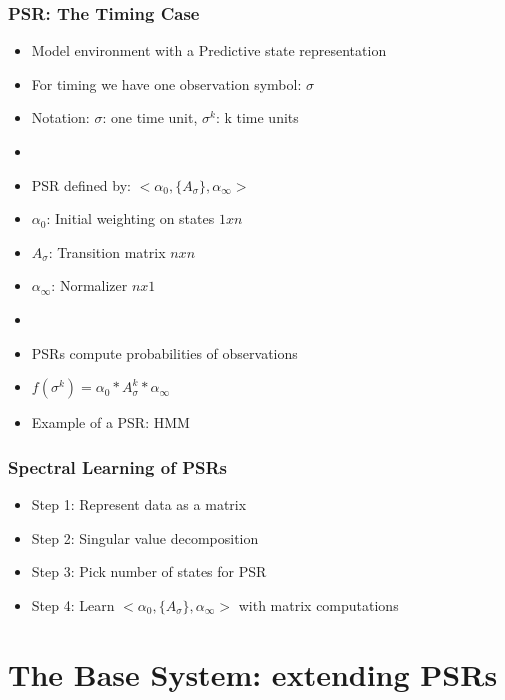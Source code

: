 \documentclass{beamer}
\begin{document}
\begin{frame}
\frametitle{PSR: The Timing Case}

\begin{itemize}
\item Model environment with a Predictive state representation
\item For timing we have one observation symbol: {$\sigma$}
\item[] Notation: $\sigma$: one time unit, $\sigma^k$: k time units
\item[]
\item PSR defined by: $<\alpha_0, \{A_\sigma\},\alpha_\infty>$
\item[] $\alpha_0$: Initial weighting on states $1xn$
\item[] $A_\sigma$: Transition matrix $nxn$
\item[] $\alpha_\infty$: Normalizer $nx1$
\item[]
\item PSRs compute probabilities of observations

\item[] $f(\sigma^k) = \alpha_0*A_\sigma^k*\alpha_\infty$
\item Example of a PSR: HMM
 
\end{itemize}

\end{frame}


\begin{frame}
\frametitle{Spectral Learning of PSRs}

\begin{itemize}
\item[] Step 1: Represent data as a matrix
\item[] Step 2: Singular value decomposition
\item[] Step 3: Pick number of states for PSR
\item[] Step 4: Learn $<\alpha_0, \{A_\sigma\},\alpha_\infty>$ with matrix computations
\end{itemize}

\end{frame}

\section{The Base System: extending PSRs}
\end{document}
